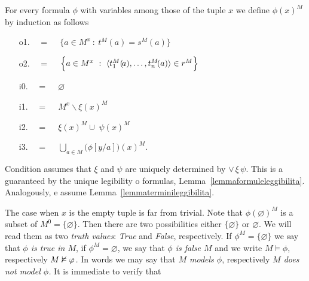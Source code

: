 \begin{definition}[ of truth]\label{defverita} For every formula $\phi$ with variables among those of the tuple $x$ we define \emph{$\phi(x)^M$\/} by induction as follows
\begin{itemize}
\item[o1.] \hspace*{15ex}\ \  =\ \ \  $\Big\{a\in M^{x}\ :\ t^M\!(a)=s^M\!(a) \Big\}$\medskip

\item[o2.] \hspace*{15ex}\ \   =\ \ \ $\Big\{a\in M^{x}\ :\ \<t_1^M(\!a),\dots,t_n^M\!(a)\>\in r^M\Big\}$\medskip

\item[i0.] \hspace*{15ex}\ \  =\ \ \  $\varnothing$\bigskip

\item[i1.] \hspace*{15ex}\ \   =\ \ \  $M^{x}\smallsetminus\xi(x)^M$\bigskip

\item[i2.] \hspace*{15ex}\ \   =\ \ \  $\xi(x)^M\cup\;\psi(x)^M$\bigskip

\item[i3.] \hspace*{15ex}\ \   =\ \ \ $\displaystyle\bigcup_{a\in M}\big(\phi[y/a]\big)(x)^M$.
\end{itemize}
Condition  assumes that $\xi$ and $\psi$ are uniquely determined by $\vee\,\xi\,\psi$. This is a guaranteed by the unique legibility o formulas, Lemma~\ref{lemmaformuleleggibilita}.
Analogously,  e  assume Lemma~\ref{lemmaterminileggibilita}.
\end{definition}

The case when $x$ is the empty tuple is far from trivial. Note that $\phi(\varnothing)^M$ is a subset of $M^0=\{\varnothing\}$. Then there are two possibilities either $\{\varnothing\}$ or $\varnothing$.
We will read them as two \emph{truth values}: \emph{True\/} and \emph{False}, respectively. If $\phi^M=\{\varnothing\}$ we say that \emph{$\phi$ is true in $M$}, if $\phi^M=\varnothing$, we say that \emph{$\phi$ is false $M$} and we write \emph{$M\models\phi$}, respectively \emph{$M\nvDash\varphi$.}
In words we may say that \emph{$M$ models $\phi$}, respectively \emph{$M$ does not model $\phi$.}
It is immediate to verify that

